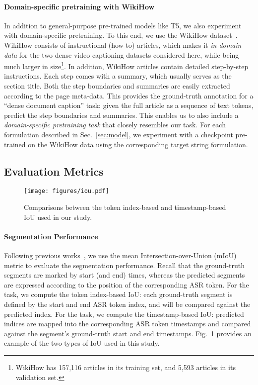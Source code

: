 \documentclass[11pt]{article}
\begin{document}
\paragraph{Domain-specific pretraining with WikiHow}
In addition to general-purpose pre-trained models like T5, we also experiment with domain-specific pretraining.
To this end, we use the WikiHow dataset~\citep{Koupaee2018WikiHowAL}. 
WikiHow consists of instructional (how-to) articles, which makes it {\em in-domain data} for the two dense video captioning datasets considered here, while being much larger in size\footnote{WikiHow has 157,116 articles in its training set, and 5,593 articles in its validation set.}.
In addition, WikiHow articles contain detailed step-by-step instructions. Each step comes with a summary, which usually serves as the section title.
Both the step boundaries and summaries are easily extracted according to the page meta-data.
This provides the ground-truth annotation for a ``dense document caption'' task: given the full article as a sequence of text tokens,
predict the step boundaries and summaries.
This enables us to also include a {\em domain-specific pretraining task} that closely resembles our task.
For each formulation described in Sec.~\ref{sec:model}, we experiment with a checkpoint pre-trained on the WikiHow data using the corresponding target string formulation.


\subsection{Evaluation Metrics}

\begin{figure}[tbp]
    \centering
    \texttt{[image: figures/iou.pdf]}
    \caption{Comparisons between the token index-based and timestamp-based IoU used in our study.
    }
    \label{fig:iou}
\end{figure}

\paragraph{Segmentation Performance}
Following previous works~\citep{Zhou2018TowardsAL,Shi2019DensePC}, we use the mean Intersection-over-Union (mIoU) metric to evaluate the segmentation performance.
Recall that the ground-truth segments are marked by start (and end) times, whereas the predicted segments are expressed according to the position of the corresponding ASR token.
For the \partitiontask task, we compute the token index-based IoU: each ground-truth segment is defined by the start and end ASR token index, and will be compared against the predicted index.
For the \vanilla task, we compute the timestamp-based IoU: predicted indices are mapped into the corresponding ASR token timestamps and compared against the segment's ground-truth start and end timestamps.
Fig.~\ref{fig:iou} provides an example of the two types of IoU used in this study.
\end{document}
